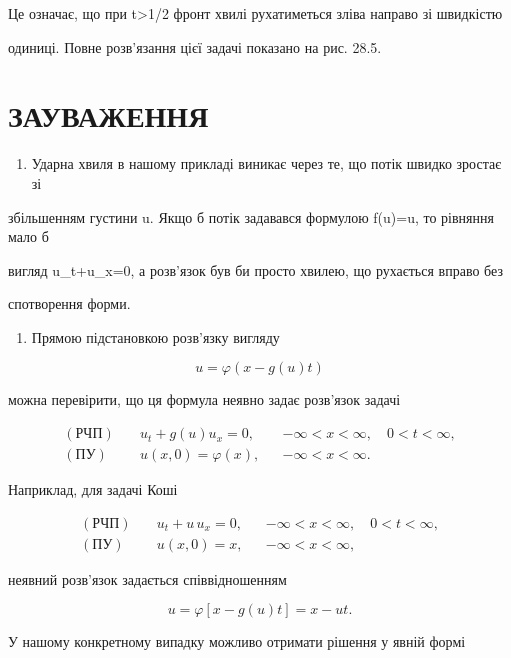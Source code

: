\documentclass[
  ukrainian,
]{article}
\providecommand{\tightlist}{%
  \setlength{\itemsep}{0pt}\setlength{\parskip}{0pt}}
\begin{document}
Це означає, що при t\textgreater1/2 фронт хвилі рухатиметься зліва
направо зі швидкістю

одиниці. Повне розв'язання цієї задачі показано на рис. 28.5.

\section{ЗАУВАЖЕННЯ}\label{ux437ux430ux443ux432ux430ux436ux435ux43dux43dux44f-11}

\begin{enumerate}
\def\labelenumi{\arabic{enumi}.}
\tightlist
\item
  Ударна хвиля в нашому прикладі виникає через те, що потік швидко
  зростає зі
\end{enumerate}

збільшенням густини u. Якщо б потік задавався формулою f(u)=u, то
рівняння мало б

вигляд u\_t+u\_x=0, а розв'язок був би просто хвилею, що рухається
вправо без

спотворення форми.

\begin{enumerate}
\def\labelenumi{\arabic{enumi}.}
\setcounter{enumi}{1}
\tightlist
\item
  Прямою підстановкою розв'язку вигляду
\end{enumerate}

\[
u=\varphi(x-g(u)t)
\]

можна перевірити, що ця формула неявно задає розв'язок задачі

\[
\begin{aligned}
(\text{РЧП})\quad & u_t + g(u)u_x = 0, && -\infty < x < \infty,\quad 0 < t < \infty,\\
(\text{ПУ})\quad & u(x,0)=\varphi(x), && -\infty < x < \infty.
\end{aligned}
\]

Наприклад, для задачі Коші

\[
\begin{aligned}
(\text{РЧП})\quad & u_t + u\,u_x = 0, && -\infty < x < \infty,\quad 0 < t < \infty,\\
(\text{ПУ})\quad & u(x,0)=x, && -\infty < x < \infty,
\end{aligned}
\]

неявний розв'язок задається співвідношенням

\[
u=\varphi[x-g(u)t]=x-ut.
\]

У нашому конкретному випадку можливо отримати рішення у явній формі
\end{document}
